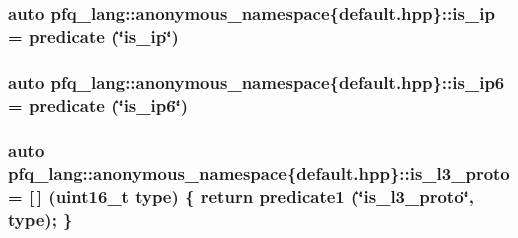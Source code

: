\hypertarget{namespacepfq__lang_1_1anonymous__namespace_02default_8hpp_03_a43ee18537268245a58354e044a134df5}{
\subsubsection[{is\-\_\-ip}]{\setlength{\rightskip}{0pt plus 5cm}auto pfq\-\_\-lang\-::anonymous\-\_\-namespace\{default.\-hpp\}\-::is\-\_\-ip = {\bf predicate} (\char`\"{}is\-\_\-ip\char`\"{})}}\label{namespacepfq__lang_1_1anonymous__namespace_02default_8hpp_03_a43ee18537268245a58354e044a134df5}
\hypertarget{namespacepfq__lang_1_1anonymous__namespace_02default_8hpp_03_a107437a3539c86e92035db62e88b7d81}{
\subsubsection[{is\-\_\-ip6}]{\setlength{\rightskip}{0pt plus 5cm}auto pfq\-\_\-lang\-::anonymous\-\_\-namespace\{default.\-hpp\}\-::is\-\_\-ip6 = {\bf predicate} (\char`\"{}is\-\_\-ip6\char`\"{})}}\label{namespacepfq__lang_1_1anonymous__namespace_02default_8hpp_03_a107437a3539c86e92035db62e88b7d81}
\hypertarget{namespacepfq__lang_1_1anonymous__namespace_02default_8hpp_03_aa447a7b5765c5c5f9036de8358f86434}{
\subsubsection[{is\-\_\-l3\-\_\-proto}]{\setlength{\rightskip}{0pt plus 5cm}auto pfq\-\_\-lang\-::anonymous\-\_\-namespace\{default.\-hpp\}\-::is\-\_\-l3\-\_\-proto = \mbox{[}$\,$\mbox{]} (uint16\-\_\-t type) \{ return {\bf predicate1} (\char`\"{}is\-\_\-l3\-\_\-proto\char`\"{}, type); \}}}\label{namespacepfq__lang_1_1anonymous__namespace_02default_8hpp_03_aa447a7b5765c5c5f9036de8358f86434}
